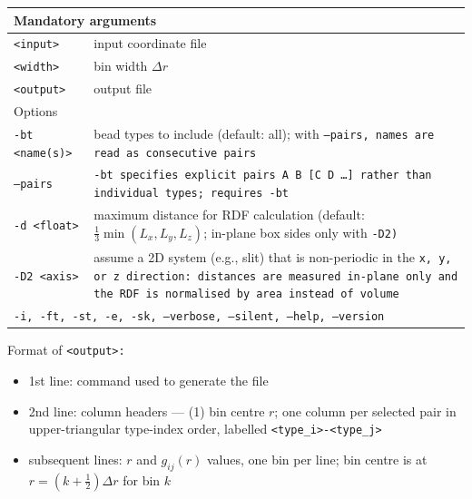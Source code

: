 \noindent
\begin{longtable}{p{}p{}}
  \toprule
  \multicolumn{2}{l}{Mandatory arguments}\\
  \midrule
  \tt{<input>}     & input coordinate file\\
  \tt{<width>}     & bin width $\Delta r$\\
  \tt{<output>}    & output file\\
  \toprule
  \multicolumn{2}{l}{Options}\\
  \midrule
  \tt{-bt <name(s)>} & bead types to include (default: all); with
                       \tt{--pairs}, names are read as consecutive pairs\\
  \tt{--pairs}       & \tt{-bt} specifies explicit pairs A B [C D \ldots{}]
                       rather than individual types; requires \tt{-bt}\\
  \tt{-d <float>}    & maximum distance for RDF calculation (default:
                       $\frac{1}{3}\min(L_x, L_y, L_z)$; in-plane box sides
                       only with \tt{-D2})\\
  \tt{-D2 <axis>}    & assume a 2D system (e.g., slit) that is non-periodic
                       in the \tt{x}, \tt{y}, or \tt{z} direction: distances
                       are measured in-plane only and the RDF is normalised
                       by area instead of volume\\
  \midrule
  \multicolumn{2}{p{0.948\textwidth}}{\tt{-i}, \tt{-ft}, \tt{-st}, \tt{-e},
    \tt{-sk}, \tt{--verbose}, \tt{--silent}, \tt{--help}, \tt{--version}}\\
  \bottomrule
\end{longtable}

\noindent
Format of \tt{<output>}:
\begin{itemize}[nosep,leftmargin=5pt]
  \item 1st line: command used to generate the file
  \item 2nd line: column headers --- (1) bin centre $r$; one column per
    selected pair in upper-triangular type-index order, labelled
    \tt{<type\_i>-<type\_j>}
  \item subsequent lines: $r$ and $g_{ij}(r)$ values, one bin per line;
    bin centre is at $r = (k + \tfrac{1}{2})\Delta r$ for bin $k$
\end{itemize}


